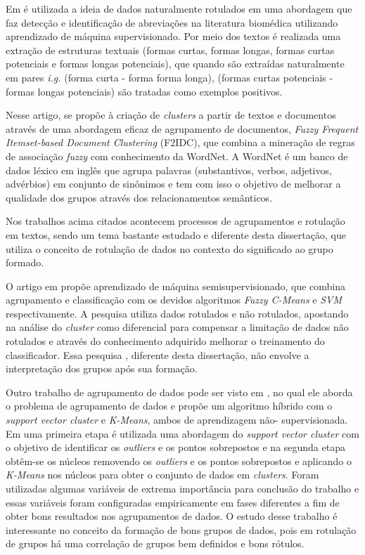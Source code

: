 Em \cite{Yeganova2010} é utilizada a ideia de dados naturalmente rotulados em uma abordagem que faz detecção e identificação de abreviações na literatura biomédica utilizando aprendizado de máquina supervisionado. Por meio dos textos é realizada uma extração de estruturas textuais (formas curtas, formas longas, formas curtas potenciais e formas longas potenciais), que quando são extraídas naturalmente em pares \textit{i.g.} (forma curta - forma forma longa), (formas curtas potenciais - formas longas potenciais) são tratadas como exemplos positivos. 

Nesse artigo, \cite{Chen2011} se propõe à criação de \textit{clusters} a partir de textos e documentos através de uma abordagem eficaz de agrupamento de documentos, \textit{Fuzzy Frequent Itemset-based Document Clustering} (F2IDC), que combina a mineração de regras de associação \textit{fuzzy} com conhecimento da WordNet. A WordNet é um banco de dados léxico em inglês que agrupa palavras (substantivos, verbos, adjetivos, advérbios) em conjunto de sinônimos e tem com isso o objetivo de melhorar a qualidade dos grupos através dos relacionamentos semânticos. 
 
Nos trabalhos acima citados \cite{Jirasirilerd2018,Yeganova2010,Chen2011} acontecem processos de agrupamentos e rotulação em textos, sendo um tema bastante estudado e diferente desta dissertação, que utiliza o conceito de rotulação de dados no contexto do significado ao grupo formado. 



O artigo em \cite{Gan2013}  propõe aprendizado de máquina semisupervisionado, que combina agrupamento e classificação com os devidos algoritmos \textit{Fuzzy C-Means} e \textit{SVM} respectivamente. A pesquisa utiliza dados rotulados e não rotulados, apostando na análise do \textit{cluster} como diferencial para compensar a limitação de dados não rotulados e através do conhecimento adquirido melhorar o treinamento do classificador. Essa pesquisa \cite{Gan2013}, diferente desta dissertação, não envolve a interpretação dos grupos após sua formação.

Outro trabalho de agrupamento de dados pode ser visto em \cite{Sun2011}, no qual ele aborda o problema de agrupamento de dados e propõe um algoritmo híbrido com o \textit{support vector cluster} e \textit{K-Means}, ambos de aprendizagem não- supervisionada. Em uma primeira etapa é utilizada uma abordagem do \textit{support vector cluster} com o objetivo de identificar os \textit{outliers} e os pontos sobrepostos e na segunda etapa obtêm-se os núcleos removendo os \textit{outliers} e os pontos sobrepostos e aplicando o \textit{K-Means} nos núcleos para obter o conjunto de dados em \textit{clusters}. Foram utilizadas algumas variáveis de extrema importância para conclusão do trabalho e essas variáveis foram configuradas empiricamente em fases diferentes a fim de obter bons resultados nos agrupamentos de dados. O estudo desse trabalho é interessante no conceito da formação de bons grupos de dados, pois em rotulação de grupos há uma correlação de grupos bem definidos e bons rótulos.

